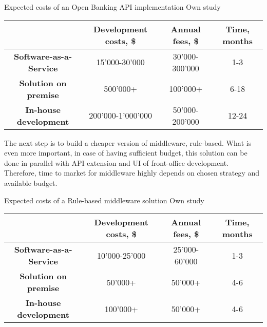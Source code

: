\mttable
{Expected costs of an Open Banking API implementation}
{Own study}
{
    \begin{tabular}{| c | c | c | c |}
        \hline
        &
        \textbf{Development costs, \$} & 
        \textbf{Annual fees, \$} &
        \textbf{Time, months} \\ \hline 
       
        \textbf{Software-as-a-Service} & 
            15'000-30'000 & 
            30'000-300'000 &
            1-3 \\ \hline 
       
        \textbf{Solution on premise} & 
            500'000+ &
            100'000+ &
            6-18 \\ \hline 
            
        \textbf{In-house development} &
            200'000-1'000'000 &
            50'000-200'000 &
            12-24 \\ \hline
    \end{tabular}
}

The next step is to build a cheaper version of middleware, rule-based.
What is even more important, in case of having sufficient budget, this solution can be done in parallel with API extension and UI of front-office development.
Therefore, time to market for middleware highly depends on chosen strategy and available budget.

\mttable
{Expected costs of a Rule-based middleware solution}
{Own study}
{
    \begin{tabular}{| c | c | c | c |}
        \hline
        &
        \textbf{Development costs, \$} & 
        \textbf{Annual fees, \$} &
        \textbf{Time, months} \\ \hline 
       
        \textbf{Software-as-a-Service} & 
            10'000-25'000 & 
            25'000-60'000 &
            1-3 \\ \hline 
       
        \textbf{Solution on premise} & 
            50'000+ &
            50'000+ &
            4-6 \\ \hline 
            
        \textbf{In-house development} &
            100'000+ &
            50'000+ &
            4-6 \\ \hline
    \end{tabular}
}

